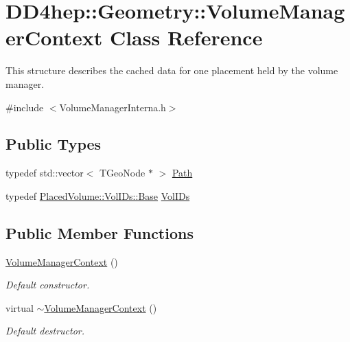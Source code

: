 \hypertarget{class_d_d4hep_1_1_geometry_1_1_volume_manager_context}{
\section{DD4hep::Geometry::VolumeManagerContext Class Reference}
\label{class_d_d4hep_1_1_geometry_1_1_volume_manager_context}
}


This structure describes the cached data for one placement held by the volume manager.  


{\ttfamily \#include $<$VolumeManagerInterna.h$>$}\subsection*{Public Types}
\begin{DoxyCompactItemize}
\item 
typedef std::vector$<$ TGeoNode $\ast$ $>$ \hyperlink{class_d_d4hep_1_1_geometry_1_1_volume_manager_context_a7873b42c6ad25a77d4d7e240286a934c}{Path}
\item 
typedef \hyperlink{class_d_d4hep_1_1_geometry_1_1_placed_volume_extension_1_1_vol_i_ds_a9328d0964ef092fd108679b2ecafd5b7}{PlacedVolume::VolIDs::Base} \hyperlink{class_d_d4hep_1_1_geometry_1_1_volume_manager_context_aedf28d4a226428cfc6ebaabaee0b4c9e}{VolIDs}
\end{DoxyCompactItemize}
\subsection*{Public Member Functions}
\begin{DoxyCompactItemize}
\item 
\hyperlink{class_d_d4hep_1_1_geometry_1_1_volume_manager_context_a7fabfa335945589f35053fa3bc3dcfc7}{VolumeManagerContext} ()
\begin{DoxyCompactList}\small\item\em Default constructor. \item\end{DoxyCompactList}\item 
virtual \hyperlink{class_d_d4hep_1_1_geometry_1_1_volume_manager_context_aa150cfab1e19826e9e6fddd194b2390a}{$\sim$VolumeManagerContext} ()
\begin{DoxyCompactList}\small\item\em Default destructor. \item\end{DoxyCompactList}\end{DoxyCompactItemize}
